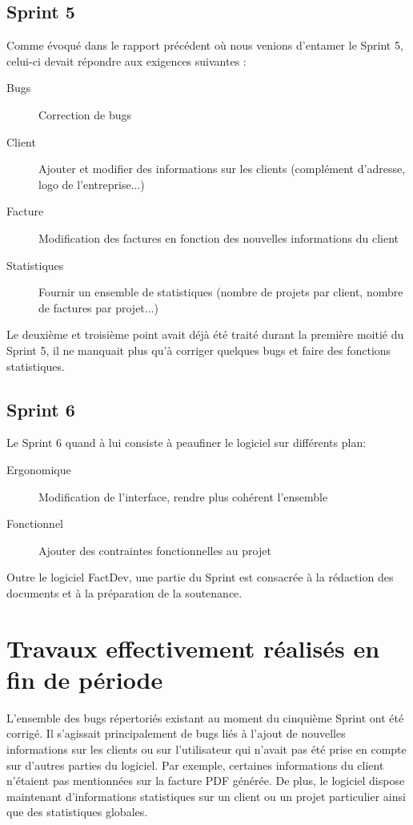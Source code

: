 \documentclass[12pt,a4paper,openany]{article}
\begin{document}
	\subsection{Sprint 5}
	Comme évoqué dans le rapport précédent où nous venions d'entamer le Sprint 5, celui-ci devait répondre aux exigences suivantes :
	\begin{description}
		\item [Bugs] Correction de bugs
		\item [Client] Ajouter et modifier des informations sur les clients (complément d'adresse, logo de l'entreprise...)
		\item [Facture] Modification des factures en fonction des nouvelles informations du client
		\item [Statistiques] Fournir un ensemble de statistiques (nombre de projets par client, nombre de factures par projet...)
	\end{description}
	Le deuxième et troisième point avait déjà été traité durant la première moitié du Sprint 5, il ne manquait plus qu'à corriger quelques bugs et faire des fonctions statistiques. 
	
	\subsection{Sprint 6}
	Le Sprint 6 quand à lui consiste à peaufiner le logiciel sur différents plan: 
	\begin{description}
		\item [Ergonomique] Modification de l'interface, rendre plus cohérent l'ensemble
		\item [Fonctionnel] Ajouter des contraintes fonctionnelles au projet
	\end{description}
	Outre le logiciel FactDev, une partie du Sprint est consacrée à la rédaction des documents et à la préparation de la soutenance. 
	\section{Travaux effectivement réalisés en fin de période}\label{work}
	L'ensemble des bugs répertoriés existant au moment du cinquième Sprint ont été corrigé. Il s’agissait principalement de bugs liés à l'ajout de nouvelles informations sur les clients ou sur l'utilisateur qui n'avait pas été prise en compte sur d'autres parties du logiciel. Par exemple, certaines informations du client n'étaient pas mentionnées sur la facture PDF générée. De plus, le logiciel dispose maintenant d'informations statistiques sur un client ou un projet particulier ainsi que des statistiques globales.  
\end{document}
